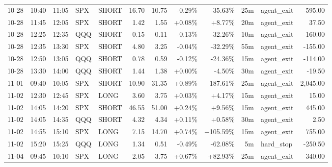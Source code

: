 \documentclass[11pt,a4paper]{article}
\begin{document}
\begin{center}
\begin{longtable}{>{\color{txtmain}}l l l l l r r r r r >{\color{txtmain}}l r}
10-28 & 10:40 & 11:05 & SPX & SHORT & 16.70 & 10.75 & \textcolor{lossred}{-0.29\%} & \textcolor{lossred}{-35.63\%} & 25m & agent\_exit & \textcolor{lossred}{-595.00} \\
10-28 & 11:45 & 12:05 & SPX & SHORT & 1.42 & 1.55 & \textcolor{wingreen}{+0.08\%} & \textcolor{wingreen}{+8.77\%} & 20m & agent\_exit & \textcolor{wingreen}{37.50} \\
10-28 & 12:25 & 12:35 & QQQ & SHORT & 0.15 & 0.11 & \textcolor{lossred}{-0.13\%} & \textcolor{lossred}{-32.26\%} & 10m & agent\_exit & \textcolor{lossred}{-160.00} \\
10-28 & 12:35 & 13:30 & SPX & SHORT & 4.80 & 3.25 & \textcolor{lossred}{-0.04\%} & \textcolor{lossred}{-32.29\%} & 55m & agent\_exit & \textcolor{lossred}{-155.00} \\
10-28 & 12:50 & 13:05 & QQQ & SHORT & 0.78 & 0.59 & \textcolor{lossred}{-0.12\%} & \textcolor{lossred}{-24.36\%} & 15m & agent\_exit & \textcolor{lossred}{-114.00} \\
10-28 & 13:30 & 14:00 & QQQ & SHORT & 1.44 & 1.38 & \textcolor{wingreen}{+0.00\%} & \textcolor{lossred}{-4.50\%} & 30m & agent\_exit & \textcolor{lossred}{-19.50} \\
11-01 & 09:40 & 10:05 & SPX & SHORT & 10.90 & 31.35 & \textcolor{wingreen}{+0.89\%} & \textcolor{wingreen}{+187.61\%} & 25m & agent\_exit & \textcolor{wingreen}{2,045.00} \\
11-02 & 12:30 & 12:45 & SPX & LONG & 3.60 & 3.75 & \textcolor{wingreen}{+0.03\%} & \textcolor{wingreen}{+4.17\%} & 15m & agent\_exit & \textcolor{wingreen}{15.00} \\
11-02 & 14:05 & 14:20 & SPX & SHORT & 46.55 & 51.00 & \textcolor{wingreen}{+0.24\%} & \textcolor{wingreen}{+9.56\%} & 15m & agent\_exit & \textcolor{wingreen}{445.00} \\
11-02 & 14:05 & 14:35 & QQQ & SHORT & 4.32 & 4.34 & \textcolor{wingreen}{+0.11\%} & \textcolor{wingreen}{+0.58\%} & 30m & agent\_exit & \textcolor{wingreen}{2.50} \\
11-02 & 14:55 & 15:10 & SPX & LONG & 7.15 & 14.70 & \textcolor{wingreen}{+0.74\%} & \textcolor{wingreen}{+105.59\%} & 15m & agent\_exit & \textcolor{wingreen}{755.00} \\
11-02 & 15:20 & 15:25 & QQQ & LONG & 1.34 & 0.51 & \textcolor{lossred}{-0.49\%} & \textcolor{lossred}{-62.08\%} & 5m & hard\_stop & \textcolor{lossred}{-250.50} \\
11-04 & 09:45 & 10:10 & SPX & LONG & 2.05 & 3.75 & \textcolor{wingreen}{+0.67\%} & \textcolor{wingreen}{+82.93\%} & 25m & agent\_exit & \textcolor{wingreen}{340.00} \\

\end{longtable}
\end{center}
\end{document}
